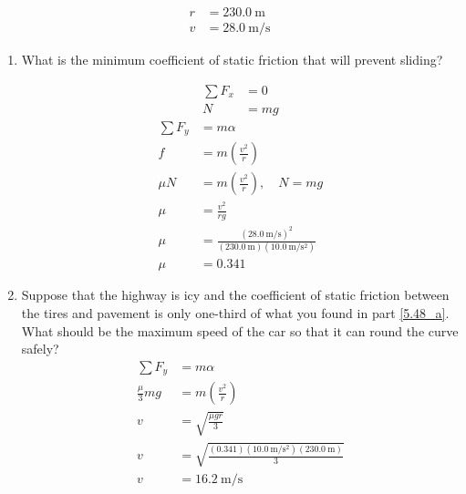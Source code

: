 \documentclass{article}
\begin{document}
\begin{align*}
	r & = \SI{230.0}{\meter} \\
	v & = \SI{28.0}{\meter \per \second}
\end{align*}
\begin{enumerate}[label = \textbf{(\alph*)}]
	\item \label{5.48_a} What is the minimum coefficient of static friction that will prevent sliding?
		\begin{center}
		\end{center}
		\begin{align*}
			\sum F_x & = 0 \\
			N & = mg
		\end{align*}
		\begin{align*}
			\sum F_y & = m\alpha \\
			f & = m \left( \frac{ v^2 }{ r } \right) \\
			\mu N & = m \left( \frac{ v^2 }{ r } \right), \quad N = mg \\
			\mu & = \frac{ v^2 }{ rg } \\
			\mu & = \frac{ (\SI{28.0}{\meter \per \second})^2 }{ (\SI{230.0}{\meter})(\SI{10.0}{\meter \per \second \squared}) } \\
			\mu & = 0.341
		\end{align*}
	\item Suppose that the highway is icy and the coefficient of static friction between the tires and pavement is only one-third of what you found in part \ref{5.48_a}. What should be the maximum speed of the car so that it can round the curve safely?
		\begin{align*}
			\sum F_y & = m\alpha \\
			\frac{ \mu }{ 3 }mg & = m \left( \frac{ v^2 }{ r } \right) \\
			v & = \sqrt{ \frac{ \mu gr }{ 3 } } \\
			v & = \sqrt{ \frac{ (0.341)(\SI{10.0}{\meter \per \second \squared})(\SI{230.0}{\meter}) }{ 3 } } \\
			v & = \SI{16.2}{\meter \per \second}
		\end{align*}
\end{enumerate}
\end{document}
